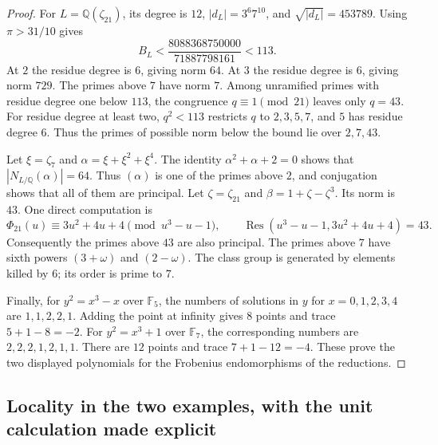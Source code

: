 \begin{proof}
For \(L=\mathbb Q(\zeta_{21})\), its degree is \(12\),
\(|d_L|=3^6 7^{10}\), and \(\sqrt{|d_L|}=453789\).
Using \(\pi>31/10\) gives
\[
 B_L<
 \frac{8088368750000}{71887798161}<113.
\]
At \(2\) the residue degree is \(6\), giving norm \(64\).
At \(3\) the residue degree is \(6\), giving norm \(729\).
The primes above \(7\) have norm \(7\). Among unramified primes
with residue degree one below \(113\), the congruence
\(q\equiv1\pmod {21}\) leaves only \(q=43\).
For residue degree at least two, \(q^2<113\) restricts \(q\)
to \(2,3,5,7\), and \(5\) has residue degree \(6\).
Thus the primes of possible norm below the bound lie over
\(2,7,43\).

Let \(\xi=\zeta_7\) and
\(\alpha=\xi+\xi^2+\xi^4\). The identity
\(\alpha^2+\alpha+2=0\) shows that
\(|N_{L/\mathbb Q}(\alpha)|=64\).
Thus \((\alpha)\) is one of the primes above \(2\), and conjugation
shows that all of them are principal.
Let \(\zeta=\zeta_{21}\) and \(\beta=1+\zeta-\zeta^3\).
Its norm is \(43\). One direct computation is
\[
 \Phi_{21}(u)\equiv3u^2+4u+4\pmod {u^3-u-1},
 \qquad
 \operatorname{Res}(u^3-u-1,3u^2+4u+4)=43 .
\]
Consequently the primes above \(43\) are also principal.
The primes above \(7\) have sixth powers \((3+\omega)\) and
\((2-\omega)\). The class group is generated by elements killed
by \(6\); its order is prime to \(7\).

Finally, for \(y^2=x^3-x\) over \(\mathbb F_5\), the numbers of
solutions in \(y\) for \(x=0,1,2,3,4\) are
\(1,1,2,2,1\). Adding the point at infinity gives \(8\) points
and trace \(5+1-8=-2\).
For \(y^2=x^3+1\) over \(\mathbb F_7\), the corresponding numbers
are \(2,2,2,1,2,1,1\). There are \(12\) points and trace
\(7+1-12=-4\). These prove the two displayed polynomials for
the Frobenius endomorphisms of the reductions.
\end{proof}

\subsection{Locality in the two examples, with the unit calculation made explicit}

